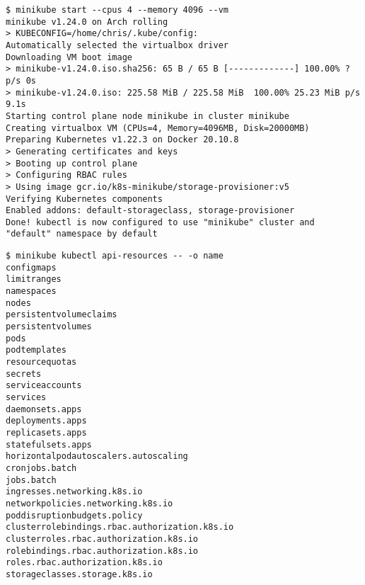 \documentclass[titlepage]{report}
\begin{document}
\begin{minipage}{\linewidth}
\begin{lstlisting}[caption={Running the minikube start command},label={lst:minikubeStart},basicstyle=\small]
$ minikube start --cpus 4 --memory 4096 --vm
minikube v1.24.0 on Arch rolling
> KUBECONFIG=/home/chris/.kube/config:
Automatically selected the virtualbox driver
Downloading VM boot image
> minikube-v1.24.0.iso.sha256: 65 B / 65 B [-------------] 100.00% ? p/s 0s
> minikube-v1.24.0.iso: 225.58 MiB / 225.58 MiB  100.00% 25.23 MiB p/s 9.1s
Starting control plane node minikube in cluster minikube
Creating virtualbox VM (CPUs=4, Memory=4096MB, Disk=20000MB)
Preparing Kubernetes v1.22.3 on Docker 20.10.8
> Generating certificates and keys
> Booting up control plane
> Configuring RBAC rules
> Using image gcr.io/k8s-minikube/storage-provisioner:v5
Verifying Kubernetes components
Enabled addons: default-storageclass, storage-provisioner
Done! kubectl is now configured to use "minikube" cluster and "default" namespace by default
\end{lstlisting}
\end{minipage}

\begin{minipage}{\linewidth}
\begin{lstlisting}[caption={Listing api resources in a Kubernetes Cluster (shortened)},label={lst:apiResources}]
$ minikube kubectl api-resources -- -o name
configmaps
limitranges
namespaces
nodes
persistentvolumeclaims
persistentvolumes
pods
podtemplates
resourcequotas
secrets
serviceaccounts
services
daemonsets.apps
deployments.apps
replicasets.apps
statefulsets.apps
horizontalpodautoscalers.autoscaling
cronjobs.batch
jobs.batch
ingresses.networking.k8s.io
networkpolicies.networking.k8s.io
poddisruptionbudgets.policy
clusterrolebindings.rbac.authorization.k8s.io
clusterroles.rbac.authorization.k8s.io
rolebindings.rbac.authorization.k8s.io
roles.rbac.authorization.k8s.io
storageclasses.storage.k8s.io
\end{lstlisting}
\end{minipage}
\end{document}

